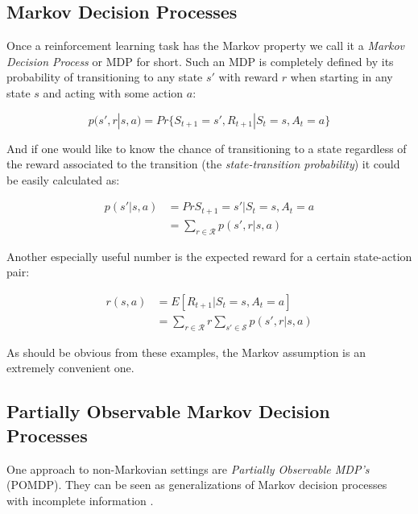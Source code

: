 \subsection{Markov Decision Processes}
\label{sub:markov_decision_processes}
Once a reinforcement learning task has the Markov property
we call it a \textit{Markov Decision Process} or MDP for short. 
Such an MDP is completely defined by its probability
of transitioning to any state $s'$ with reward $r$
when starting in any state $s$ and acting with some action $a$:

\begin{equation}
  p(s', r|s, a) = Pr\{S_{t+1}=s', R_{t+1}|S_t=s, A_t=a\}
\end{equation}

And if one would like to know the chance of transitioning to a state
regardless of the reward associated to the transition
(the \textit{state-transition probability})
it could be easily calculated as:

\begin{equation}
  \begin{split}
    p(s'|s, a)
    &= Pr{S_{t+1}=s'|S_t=s, A_t=a} \\
    &= \sum_{r \in \mathcal{R}} p(s', r|s, a)
  \end{split}
\end{equation}

Another especially useful number is the expected reward
for a certain state-action pair:

\begin{equation}
  \begin{split}
    r(s, a)
    &= E[R_{t+1} | S_t = s, A_t = a] \\
    &= \sum_{r \in \mathcal{R}}r \sum_{s' \in \mathcal{S}} p(s', r|s, a)
  \end{split}
\end{equation}

As should be obvious from these examples,
the Markov assumption
is an extremely convenient one.

\subsection{Partially Observable Markov Decision Processes}
\label{sub:partially_observable_markov_decision_processes}
One approach to non-Markovian settings
are \textit{Partially Observable MDP's} (POMDP).
They can be seen as generalizations of Markov decision processes
with incomplete information
\parencite{lovejoy1991survey}.

